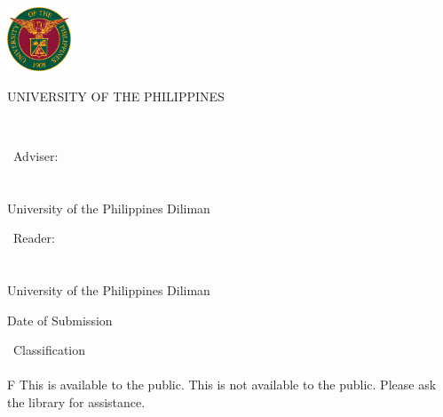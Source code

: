 \center
\vspace*{0.3in}

\includegraphics[height=0.75in]{images/UP-Seal.png}

\medskip\bigskip

UNIVERSITY OF THE PHILIPPINES

\bigskip\bigskip

\Degree

\bigskip\bigskip\bigskip

\textbf{\Student}\\
\bigskip
\Title

\bigskip\bigskip

\Type\ Adviser:\\
\bigskip
\textbf{\Adviser}\\
\Department\\
University of the Philippines Diliman

\bigskip\bigskip

\Type\ Reader:\\
\bigskip
\textbf{\Reader}\\
\Department\\
University of the Philippines Diliman

\bigskip\bigskip\bigskip

Date of Submission\\
\bigskip
\SubmissionDate

\bigskip\bigskip\bigskip\bigskip

\Type\ Classification\\
\bigskip
\textbf{\Classification}\\
\bigskip
\if \Classification F
This \MakeLowercase{\Type} is available to the public.
\else
This \MakeLowercase{\Type} is not available to the public. Please ask the library for assistance.
\fi

